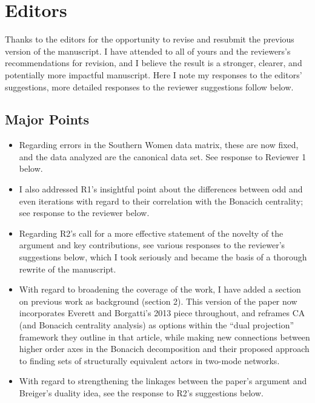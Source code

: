 \documentclass{article}
\begin{document}
\section*{Editors}

Thanks to the editors for the opportunity to revise and resubmit the previous version of the manuscript. I have attended to all of yours and the reviewers's recommendations for revision, and I believe the result is a stronger, clearer, and potentially more impactful manuscript. Here I note my responses to the editors' suggestions, more detailed responses to the reviewer suggestions follow below.

\subsection*{Major Points}
\begin{itemize}
    \item Regarding errors in the Southern Women data matrix, these are now fixed, and the data analyzed are the canonical data set. See response to Reviewer 1 below.
    \item I also addressed R1's insightful point about the differences between odd and even iterations with regard to their correlation with the Bonacich centrality; see response to the reviewer below. 
    \item Regarding R2's call for a more effective statement of the novelty of the argument and key contributions, see various responses to the reviewer's suggestions below, which I took seriously and became the basis of a thorough rewrite of the manuscript. 
    \item With regard to broadening the coverage of the work, I have added a section on previous work as background (section 2). This version of the paper now incorporates Everett and Borgatti's 2013 piece throughout, and reframes CA (and Bonacich centrality analysis) as options within the ``dual projection'' framework they outline in that article, while making new connections between higher order axes in the Bonacich decomposition and their proposed approach to finding sets of structurally equivalent actors in two-mode networks. 
    \item With regard to strengthening the linkages between the paper's argument and Breiger's duality idea, see the response to R2's suggestions below. 
\end{itemize}
\end{document}
